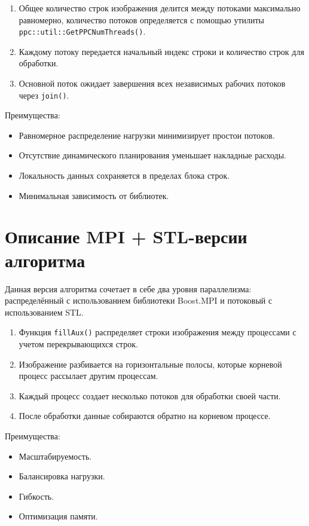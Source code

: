 \documentclass[a4paper,12pt]{article}
\begin{document}
\begin{enumerate}
    \item Общее количество строк изображения делится между потоками максимально равномерно, количество потоков определяется с помощью утилиты \texttt{ppc::util::GetPPCNumThreads()}.
    \item Каждому потоку передается начальный индекс строки и количество строк для обработки.
    \item Основной поток ожидает завершения всех независимых рабочих потоков через \texttt{join()}.
\end{enumerate}

Преимущества:
\begin{itemize}
    \item Равномерное распределение нагрузки минимизирует простои потоков.
    \item Отсутствие динамического планирования уменьшает накладные расходы.
    \item Локальность данных сохраняется в пределах блока строк.
    \item Минимальная зависимость от библиотек.
\end{itemize}

\section*{Описание MPI + STL-версии алгоритма}
Данная версия алгоритма сочетает в себе два уровня параллелизма: распределённый с использованием библиотеки Boost.MPI и потоковый с использованием STL.

\begin{enumerate}
    \item Функция \texttt{fillAux()} распределяет строки изображения между процессами с учетом перекрывающихся строк.
    \item Изображение разбивается на горизонтальные полосы, которые корневой процесс рассылает другим процессам.
    \item Каждый процесс создает несколько потоков для обработки своей части.
    \item После обработки данные собираются обратно на корневом процессе.
\end{enumerate}

Преимущества:
\begin{itemize}
    \item Масштабируемость.
    \item Балансировка нагрузки.
    \item Гибкость.
    \item Оптимизация памяти.
\end{itemize}
\end{document}
